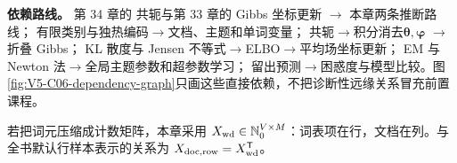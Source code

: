 \documentclass[UTF8,a4paper,11pt,openany]{ctexbook}
\begin{document}
\setcounter{page}{855}
\setcounter{chapter}{35}
\setcounter{section}{0}
\setcounter{figure}{0}
\pagestyle{headings}
\textbf{依赖路线。}
第 34 章的 \DirichletMultinomial{}共轭与第 33 章的 Gibbs 坐标更新 $\to$ 本章两条推断路线；
有限类别与独热编码$\to$文档、主题和单词变量；
\DirichletMultinomial{}共轭$\to$积分消去$\boldsymbol\theta,\boldsymbol\varphi$
$\to$折叠 Gibbs；
KL 散度与 Jensen 不等式$\to$ELBO$\to$平均场坐标更新；
EM 与 Newton 法$\to$全局主题参数和超参数学习；
留出预测$\to$困惑度与模型比较。图\ref{fig:V5-C06-dependency-graph}只画这些直接依赖，不把诊断性远缘关系冒充前置课程。\par\medskip

\FloatBarrier
\begin{keypointbox}[title=数据方向桥：LDA 语料仍按列放文档]
若把词元压缩成计数矩阵，本章采用 $X_{\rm wd}\in\mathbb N_0^{V\times M}$：词表项在行，文档在列。与全书默认行样本表示的关系为 $X_{{\rm doc},{\rm row}}=X_{\rm wd}^{\mathsf T}$。
\end{keypointbox}
\end{document}
